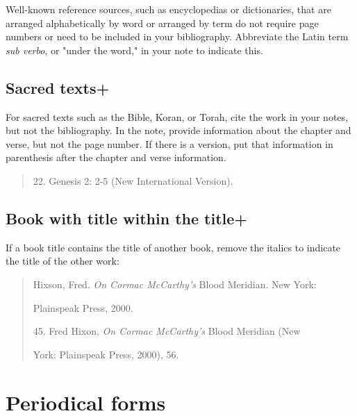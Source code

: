  Well-known reference sources, such as encyclopedias or dictionaries, that are arranged alphabetically
by word or arranged by term do not require page numbers or need to be included in your bibliography. Abbreviate the Latin term \emph{sub verbo}, or "under the word," in your note to indicate this.

\subsection{Sacred texts+}

For sacred texts such as the Bible, Koran, or Torah, cite the work in your notes, but not the bibliography. In the note, provide information about the chapter and verse, but not the page number. If there is a version, put that information in
parenthesis after the chapter and verse information.

\begin{quote}

\hspace{.4in}22. Genesis 2: 2-5 (New International Version).

\end{quote}

\subsection{Book with title within the title+}
If a book title contains the title of another book, remove the italics to indicate the title
of the other work:

\begin{quote}
Hixson, Fred. \emph{On Cormac McCarthy's }Blood Meridian. New York: 

\hspace{.4in}Plainspeak Press, 2000.

\medskip

\hspace{.4in}45. Fred Hixon, \emph{On Cormac McCarthy's} Blood Meridian (New

York: Plainspeak Press, 2000), 56.

\end{quote}




\section{Periodical forms}

